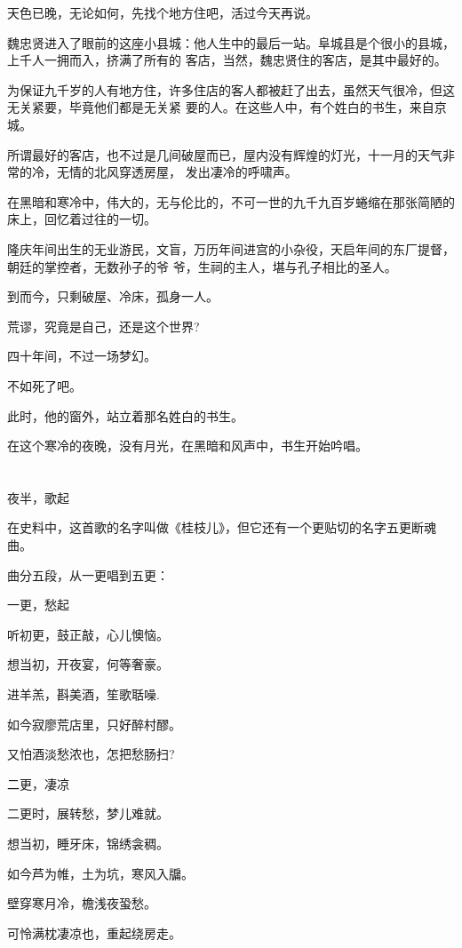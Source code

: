 \documentclass[11pt,a4paper,onecolumn]{article}
\begin{document}
天色已晚，无论如何，先找个地方住吧，活过今天再说。

魏忠贤进入了眼前的这座小县城：他人生中的最后一站。阜城县是个很小的县城，上千人一拥而入，挤满了所有的
客店，当然，魏忠贤住的客店，是其中最好的。

为保证九千岁的人有地方住，许多住店的客人都被赶了出去，虽然天气很冷，但这无关紧要，毕竟他们都是无关紧
要的人。在这些人中，有个姓白的书生，来自京城。

所谓最好的客店，也不过是几间破屋而已，屋内没有辉煌的灯光，十一月的天气非常的冷，无情的北风穿透房屋，
发出凄冷的呼啸声。

在黑暗和寒冷中，伟大的，无与伦比的，不可一世的九千九百岁蜷缩在那张简陋的床上，回忆着过往的一切。

隆庆年间出生的无业游民，文盲，万历年间进宫的小杂役，天启年间的东厂提督，朝廷的掌控者，无数孙子的爷
爷，生祠的主人，堪与孔子相比的圣人。

到而今，只剩破屋、冷床，孤身一人。

荒谬，究竟是自己，还是这个世界?

四十年间，不过一场梦幻。

不如死了吧。

此时，他的窗外，站立着那名姓白的书生。

在这个寒冷的夜晚，没有月光，在黑暗和风声中，书生开始吟唱。

\section[\thesection]{}

夜半，歌起

在史料中，这首歌的名字叫做《桂枝儿》，但它还有一个更贴切的名字\myrule 五更断魂曲。

曲分五段，从一更唱到五更：

一更，愁起

听初更，鼓正敲，心儿懊恼。

想当初，开夜宴，何等奢豪。

进羊羔，斟美酒，笙歌聒噪.

如今寂廖荒店里，只好醉村醪。

又怕酒淡愁浓也，怎把愁肠扫?

二更，凄凉

二更时，展转愁，梦儿难就。

想当初，睡牙床，锦绣衾稠。

如今芦为帷，土为坑，寒风入牖。

壁穿寒月冷，檐浅夜蛩愁。

可怜满枕凄凉也，重起绕房走。
\end{document}
